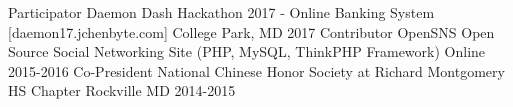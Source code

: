 

\begin{cvhonors}
  \cvhonor
    {Participator}
    {Daemon Dash Hackathon 2017 - Online Banking System [daemon17.jchenbyte.com]}
    {College Park, MD}
    {2017}
  \cvhonor
    {Contributor}
    {OpenSNS Open Source Social Networking Site (PHP, MySQL, ThinkPHP Framework)}
    {Online}
    {2015-2016}
  \cvhonor
    {Co-President}
    {National Chinese Honor Society at Richard Montgomery HS Chapter}
    {Rockville MD}
    {2014-2015}



\end{cvhonors}


